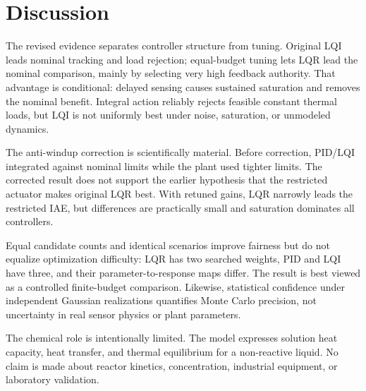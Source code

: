 \section{Discussion}\label{sec:discussion}
The revised evidence separates controller structure from tuning. Original LQI leads nominal tracking and load rejection; equal-budget tuning lets LQR lead the nominal comparison, mainly by selecting very high feedback authority. That advantage is conditional: delayed sensing causes sustained saturation and removes the nominal benefit. Integral action reliably rejects feasible constant thermal loads, but LQI is not uniformly best under noise, saturation, or unmodeled dynamics.

The anti-windup correction is scientifically material. Before correction, PID/LQI integrated against nominal limits while the plant used tighter limits. The corrected result does not support the earlier hypothesis that the restricted actuator makes original LQR best. With retuned gains, LQR narrowly leads the restricted IAE, but differences are practically small and saturation dominates all controllers.

Equal candidate counts and identical scenarios improve fairness but do not equalize optimization difficulty: LQR has two searched weights, PID and LQI have three, and their parameter-to-response maps differ. The result is best viewed as a controlled finite-budget comparison. Likewise, statistical confidence under independent Gaussian realizations quantifies Monte Carlo precision, not uncertainty in real sensor physics or plant parameters.

The chemical role is intentionally limited. The model expresses solution heat capacity, heat transfer, and thermal equilibrium for a non-reactive liquid. No claim is made about reactor kinetics, concentration, industrial equipment, or laboratory validation.

